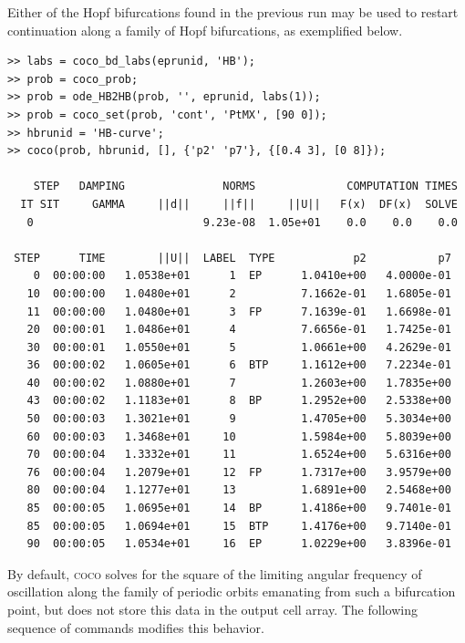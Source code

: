 Either of the Hopf bifurcations found in the previous run may be used to restart continuation along a family of Hopf bifurcations, as exemplified below.
\begin{lstlisting}[language=coco-highlight,frame=lines]
>> labs = coco_bd_labs(eprunid, 'HB');
>> prob = coco_prob;
>> prob = ode_HB2HB(prob, '', eprunid, labs(1));
>> prob = coco_set(prob, 'cont', 'PtMX', [90 0]);
>> hbrunid = 'HB-curve';
>> coco(prob, hbrunid, [], {'p2' 'p7'}, {[0.4 3], [0 8]});

    STEP   DAMPING               NORMS              COMPUTATION TIMES
  IT SIT     GAMMA     ||d||     ||f||     ||U||   F(x)  DF(x)  SOLVE
   0                          9.23e-08  1.05e+01    0.0    0.0    0.0

 STEP      TIME        ||U||  LABEL  TYPE            p2           p7
    0  00:00:00   1.0538e+01      1  EP      1.0410e+00   4.0000e-01
   10  00:00:00   1.0480e+01      2          7.1662e-01   1.6805e-01
   11  00:00:00   1.0480e+01      3  FP      7.1639e-01   1.6698e-01
   20  00:00:01   1.0486e+01      4          7.6656e-01   1.7425e-01
   30  00:00:01   1.0550e+01      5          1.0661e+00   4.2629e-01
   36  00:00:02   1.0605e+01      6  BTP     1.1612e+00   7.2234e-01
   40  00:00:02   1.0880e+01      7          1.2603e+00   1.7835e+00
   43  00:00:02   1.1183e+01      8  BP      1.2952e+00   2.5338e+00
   50  00:00:03   1.3021e+01      9          1.4705e+00   5.3034e+00
   60  00:00:03   1.3468e+01     10          1.5984e+00   5.8039e+00
   70  00:00:04   1.3332e+01     11          1.6524e+00   5.6316e+00
   76  00:00:04   1.2079e+01     12  FP      1.7317e+00   3.9579e+00
   80  00:00:04   1.1277e+01     13          1.6891e+00   2.5468e+00
   85  00:00:05   1.0695e+01     14  BP      1.4186e+00   9.7401e-01
   85  00:00:05   1.0694e+01     15  BTP     1.4176e+00   9.7140e-01
   90  00:00:05   1.0534e+01     16  EP      1.0229e+00   3.8396e-01
\end{lstlisting}
By default, \textsc{coco} solves for the square of the limiting angular frequency of oscillation along the family of periodic orbits emanating from such a bifurcation point, but does not store this data in the output cell array. The following sequence of commands modifies this behavior.
